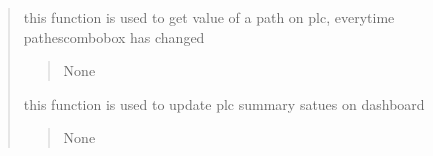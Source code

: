 \documentclass[letterpaper,10pt,english]{sphinxmanual}
\begin{document}
\begin{quote}
\begin{savenotes}
\begin{fulllineitems}

\begin{savenotes}\begin{fulllineitems}
\label{\detokenize{setting/setting_api:oxin.setting_api.API.update_path_plc}}
\pysigstartsignatures
{}
\pysigstopsignatures
\sphinxAtStartPar
this function is used to get value of a path on plc, everytime pathes\sphinxhyphen{}combobox has changed
\begin{quote}\begin{description}
\sphinxAtStartPar
None

\end{description}\end{quote}

\end{fulllineitems}\end{savenotes}


\begin{savenotes}\begin{fulllineitems}
\label{\detokenize{setting/setting_api:oxin.setting_api.API.update_plc_dashboard_parms}}
\pysigstartsignatures
{}
\pysigstopsignatures
\sphinxAtStartPar
this function is used to update plc summary satues on dashboard
\begin{quote}\begin{description}
\sphinxAtStartPar
None

\end{description}\end{quote}

\end{fulllineitems}\end{savenotes}


\begin{savenotes}\begin{fulllineitems}
\label{\detokenize{setting/setting_api:oxin.setting_api.API.write_parms}}
\pysigstartsignatures
{}
\pysigstopsignatures
\end{fulllineitems}\end{savenotes}



\end{fulllineitems}
\end{savenotes}
\end{quote}
\end{document}
